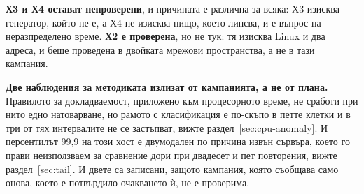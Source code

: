\textbf{Х3 и Х4 остават непроверени}, и причината е различна за всяка: Х3 изисква генератор, който
 не е, а Х4 не изисква нищо, което липсва, и е въпрос на неразпределено време.
\textbf{Х2 е проверена}, но не тук: тя изисква Linux и два адреса, и беше проведена в двойката
мрежови пространства, а не в тази кампания.

\textbf{Две наблюдения за методиката излизат от кампанията, а не от плана.} Правилото за
докладваемост, приложено към процесорното време, не сработи при нито едно натоварване, но
рамото с класификация е по-скъпо в петте клетки и в три от тях интервалите не се застъпват,
вижте раздел~\ref{sec:cpu-anomaly}. И персентилът 99,9
на този хост е двумодален по причина извън сървъра, което го прави неизползваем за сравнение
дори при двадесет и пет повторения, вижте раздел~\ref{sec:tail}. И двете са записани, защото
кампания, която съобщава само онова, което е потвърдило очакването ѝ, не е проверима.
